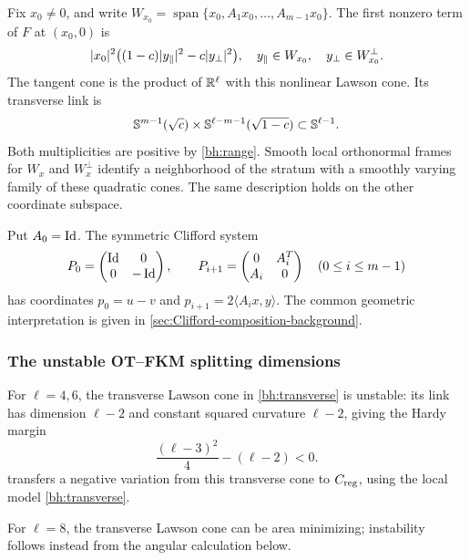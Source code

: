 Fix $x_0\ne0$, and write
$W_{x_0}=\operatorname{span}\{x_0,A_1x_0,\ldots,A_{m-1}x_0\}$.
The first nonzero term of $F$ at $(x_0,0)$ is
\begin{equation}\label{bh:transverse}
 \lvert x_0\rvert^2\big((1-c)\lvert y_\parallel\rvert^2
                         -c\lvert y_\perp\rvert^2\big),
 \quad y_\parallel\in W_{x_0},\quad y_\perp\in W_{x_0}^\perp.
\end{equation}
The tangent cone is the product of $\mathbb R^\ell$ with this nonlinear
Lawson cone. Its transverse link is
\[
 \mathbb S^{m-1}(\sqrt c)\times
 \mathbb S^{\ell-m-1}(\sqrt{1-c})\subset\mathbb S^{\ell-1}.
\]
Both multiplicities are positive by \eqref{bh:range}. Smooth local
orthonormal frames for $W_x$ and $W_x^\perp$ identify a neighborhood
of the stratum with a smoothly varying family of these quadratic cones.
The same description holds on the other coordinate subspace. 

\begin{remark}
\label{rem:split-composed-foliation}
Put $A_0=\operatorname{Id}$. The symmetric Clifford system
\[
 P_0=\begin{pmatrix}\operatorname{Id}&0\\0&-\operatorname{Id}\end{pmatrix},\qquad
 P_{i+1}=\begin{pmatrix}0&A_i^T\\A_i&0\end{pmatrix}
 \quad(0\leq i\leq m-1)
\]
has coordinates $p_0=u-v$ and $p_{i+1}=2\langle A_i x,y\rangle$.
The common geometric interpretation is given in
\cref{sec:Clifford-composition-background}.
\end{remark}


\subsubsection{The unstable OT--FKM splitting dimensions}

For $\ell=4,6$, the transverse Lawson cone in \eqref{bh:transverse}
is unstable: its link has dimension $\ell-2$ and constant squared
curvature $\ell-2$, giving the Hardy margin
\begin{equation}\label{bh:Lawson-margin}
 \frac{(\ell-3)^2}{4}-(\ell-2)<0.
\end{equation}
 transfers a negative
variation from this transverse cone to $C_{\rm reg}$, using the
local model \eqref{bh:transverse}.

For $\ell=8$, the transverse Lawson cone can be area minimizing;
instability follows instead from the angular calculation below.

